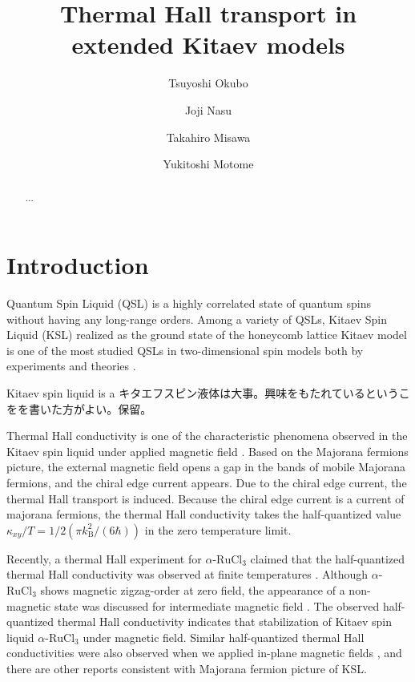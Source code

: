 \documentclass[reprint,amsmath,amssymb,aps,prx]{revtex4-2}
\begin{document}
\title{Thermal Hall transport in extended Kitaev models}
\author{Tsuyoshi Okubo}
\author{Joji Nasu}
\author{Takahiro Misawa}
\author{Yukitoshi Motome}


\begin{abstract}
...
\end{abstract}

\maketitle
\section{Introduction}
Quantum Spin Liquid (QSL) is a highly correlated state of quantum spins 
without having any long-range orders. Among a variety of QSLs, Kitaev Spin Liquid (KSL) 
realized as the ground state of the honeycomb lattice Kitaev model \cite{Kitaev2006} 
is one of the most studied QSLs in two-dimensional spin models both by experiments and theories \cite{xxx}. 

Kitaev spin liquid is a キタエフスピン液体は大事。興味をもたれているというこをを書いた方がよい。保留。

Thermal Hall conductivity is one of the characteristic phenomena observed in the Kitaev spin liquid under applied magnetic field \cite{Kitaev2006}. Based on the Majorana fermions picture, the external magnetic field opens a gap in the bands of mobile Majorana fermions, and the chiral edge current appears. Due to the chiral edge current, the thermal Hall transport is induced. Because the chiral edge current is a current of majorana fermions, the thermal Hall conductivity takes the half-quantized value $\kappa_{xy}/T = 1/2 (\pi k_{\mathrm{B}}^2/(6\hbar))$ in the zero temperature limit.

Recently, a thermal Hall experiment for $\alpha$-$\mathrm{RuCl_3}$ claimed that the half-quantized thermal Hall conductivity was observed at finite temperatures \cite{RuCl_3_kxy}. Although $\alpha$-$\mathrm{RuCl_3}$ shows magnetic zigzag-order at zero field\cite{xxx}, the appearance of a non-magnetic state was discussed for intermediate magnetic field \cite{xxx}. The observed half-quantized thermal Hall conductivity indicates that stabilization of Kitaev spin liquid $\alpha$-$\mathrm{RuCl_3}$ under magnetic field. Similar half-quantized thermal Hall conductivities were also observed when we applied in-plane magnetic fields \cite{xxx}, and there are other reports consistent with Majorana fermion picture of KSL\cite{xxx,xxx}.
\end{document}
